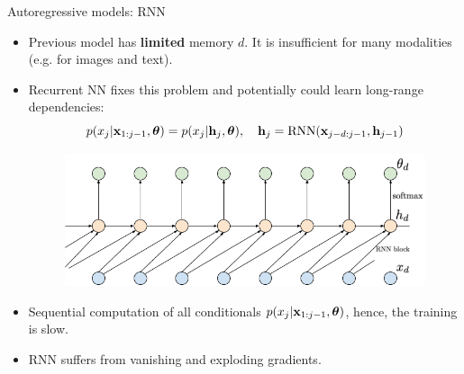 \documentclass{beamer}
\begin{document}
\begin{frame}{Autoregressive models: RNN}
	\begin{itemize}
		\item Previous model has \textbf{limited} memory $d$. It is insufficient for many modalities (e.g. for images and text). 
		\item Recurrent NN fixes this problem and potentially could learn long-range dependencies:
		\[
			p(x_j | \mathbf{x}_{1:j - 1}, \boldsymbol{\theta}) = p(x_j | \mathbf{h}_j, \boldsymbol{\theta}), \quad \mathbf{h}_j = \text{RNN}(\mathbf{x}_{j-d:j - 1}, \mathbf{h}_{j - 1})
		\]
		 \begin{figure}
	    \centering
	    \includegraphics[width=0.7\linewidth]{figs/sequential_RNN}
		 \end{figure}
		\item Sequential computation of all conditionals $p(x_j | \mathbf{x}_{1:j-1}, \boldsymbol{\theta})$, hence, the training is slow.
		\item RNN suffers from vanishing and exploding gradients.
	\end{itemize}
\end{frame}
\end{document}
